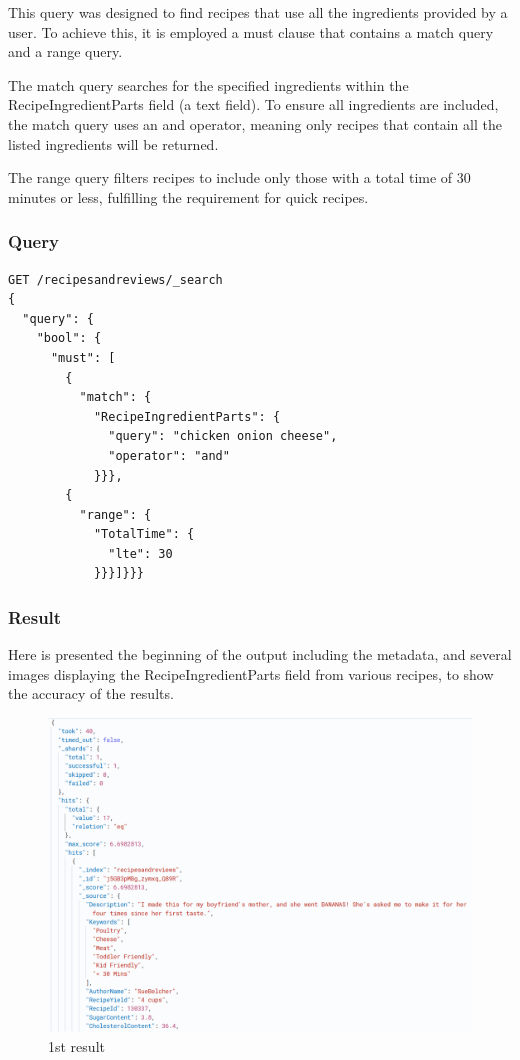 \begin{enumerate}
    This query was designed to find recipes that use all the ingredients provided by a user. To achieve this,  it is employed a must clause that contains a match query and a range query. 
    
    The match query searches for the specified ingredients within the RecipeIngredientParts field (a text field). To ensure all ingredients are included, the match query uses an and operator, meaning only recipes that contain all the listed ingredients will be returned.
    
    The range query filters recipes to include only those with a total time of 30 minutes or less, fulfilling the requirement for quick recipes.
    \subsubsection{Query}
    \begin{lstlisting}[language=Elasticsearch]
GET /recipesandreviews/_search
{
  "query": {
    "bool": {
      "must": [
        {
          "match": {
            "RecipeIngredientParts": {
              "query": "chicken onion cheese",
              "operator": "and"
            }}},
        {
          "range": {
            "TotalTime": {
              "lte": 30
            }}}]}}}
    \end{lstlisting}

    \subsubsection{Result}
    Here is presented the beginning of the output including the metadata, and several images displaying the RecipeIngredientParts field from various recipes, to show the accuracy of the results.
    \begin{figure}[H]
    \centering
    \includegraphics[width=0.9\linewidth]{Report/ReportLatex/Images/ElasticsearchResults/ingredients1.png}
    \caption{1st result}
    \label{fig:enter-label}
    \end{figure}


\end{enumerate}
